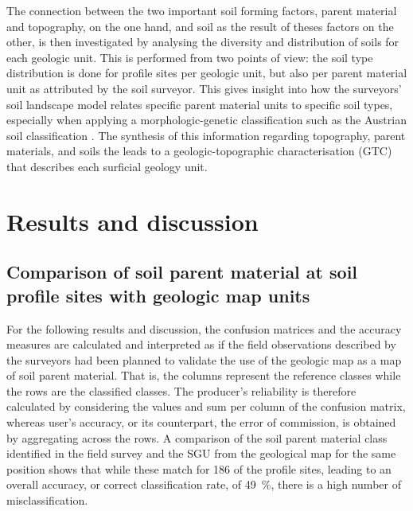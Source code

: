 \documentclass[preprint,12pt,authoryear]{elsarticle}
\begin{document}
The connection between the two important soil forming factors, parent material and topography, on the one hand, and soil as the result of theses factors on the other, is then investigated by analysing the diversity and distribution of soils for each geologic unit. This is performed from two points of view: the soil type distribution is done for profile sites per geologic unit, but also per parent material unit as attributed by the soil surveyor. This gives insight into how the surveyors' soil landscape model relates specific parent material units to specific soil types, especially when applying a morphologic-genetic classification such as the Austrian soil classification \citep{Nestroy2000,Nestroy2011}. The synthesis of this information regarding topography, parent materials, and soils the leads to a geologic-topographic characterisation (GTC) that describes each surficial geology unit. 





\clearpage
\section{Results and discussion}
\subsection{Comparison of soil parent material at soil profile sites with geologic map units}
For the following results and discussion,  the confusion matrices and the accuracy measures are calculated and interpreted as if the field observations described by the surveyors had been planned to validate the use of the geologic map as a map of soil parent material. That is, the columns represent the reference classes while the rows are the classified classes. The producer's reliability is therefore calculated by considering the values and sum per column of the confusion matrix, whereas user's accuracy, or its counterpart, the error of commission, is obtained by aggregating across the rows.
A comparison of the soil parent material class identified in the field survey and the SGU from the geological map for the same position shows that while these match for 186 of the profile sites, leading to an overall accuracy, or correct classification rate, of 49~\%, there is a high number of misclassification. 
\end{document}
